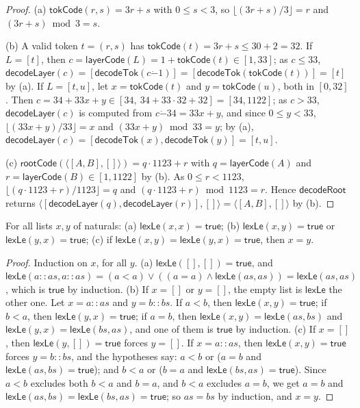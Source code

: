 \begin{proof}
(a) $\mathsf{tokCode}(r,s)=3r+s$ with $0\le s<3$, so $\lfloor(3r+s)/3\rfloor=r$ and $(3r+s)\bmod3=s$.

(b) A valid token $t=(r,s)$ has $\mathsf{tokCode}(t)=3r+s\le30+2=32$. If $L=[t]$, then
$c=\mathsf{layerCode}(L)=1+\mathsf{tokCode}(t)\in[1,33]$; as $c\le33$,
$\mathsf{decodeLayer}(c)=[\mathsf{decodeTok}(c\mathbin{\dot-}1)]=[\mathsf{decodeTok}(\mathsf{tokCode}(t))]=[t]$ by (a).
If $L=[t,u]$, let $x=\mathsf{tokCode}(t)$ and $y=\mathsf{tokCode}(u)$, both in $[0,32]$. Then
$c=34+33x+y\in[34,\ 34+33\cdot32+32]=[34,1122]$; as $c>33$, $\mathsf{decodeLayer}(c)$ is computed from
$c\mathbin{\dot-}34=33x+y$, and since $0\le y<33$, $\lfloor(33x+y)/33\rfloor=x$ and $(33x+y)\bmod33=y$; by (a),
$\mathsf{decodeLayer}(c)=[\mathsf{decodeTok}(x),\mathsf{decodeTok}(y)]=[t,u]$.

(c) $\mathsf{rootCode}(\langle[A,B],[]\rangle)=q\cdot1123+r$ with $q=\mathsf{layerCode}(A)$ and
$r=\mathsf{layerCode}(B)\in[1,1122]$ by (b). As $0\le r<1123$, $\lfloor(q\cdot1123+r)/1123\rfloor=q$ and
$(q\cdot1123+r)\bmod1123=r$. Hence $\mathsf{decodeRoot}$ returns
$\langle[\mathsf{decodeLayer}(q),\mathsf{decodeLayer}(r)],[]\rangle=\langle[A,B],[]\rangle$ by (b).
\end{proof}

\begin{lemma}\label{cb:lem:lex}
For all lists $x,y$ of naturals: (a) $\mathsf{lexLe}(x,x)=\mathsf{true}$; (b) $\mathsf{lexLe}(x,y)=\mathsf{true}$ or
$\mathsf{lexLe}(y,x)=\mathsf{true}$; (c) if $\mathsf{lexLe}(x,y)=\mathsf{lexLe}(y,x)=\mathsf{true}$, then $x=y$.
\end{lemma}

\begin{proof}
Induction on $x$, for all $y$.
(a) $\mathsf{lexLe}([],[])=\mathsf{true}$, and
$\mathsf{lexLe}(a\mathbin{::}as,a\mathbin{::}as)=(a<a)\vee((a=a)\wedge\mathsf{lexLe}(as,as))=\mathsf{lexLe}(as,as)$,
which is $\mathsf{true}$ by induction.
(b) If $x=[]$ or $y=[]$, the empty list is $\mathsf{lexLe}$ the other one. Let $x=a\mathbin{::}as$ and
$y=b\mathbin{::}bs$. If $a<b$, then $\mathsf{lexLe}(x,y)=\mathsf{true}$; if $b<a$, then $\mathsf{lexLe}(y,x)=\mathsf{true}$;
if $a=b$, then $\mathsf{lexLe}(x,y)=\mathsf{lexLe}(as,bs)$ and $\mathsf{lexLe}(y,x)=\mathsf{lexLe}(bs,as)$, and one of
them is $\mathsf{true}$ by induction.
(c) If $x=[]$, then $\mathsf{lexLe}(y,[])=\mathsf{true}$ forces $y=[]$. If $x=a\mathbin{::}as$, then
$\mathsf{lexLe}(x,y)=\mathsf{true}$ forces $y=b\mathbin{::}bs$, and the hypotheses say: $a<b$ or ($a=b$ and
$\mathsf{lexLe}(as,bs)=\mathsf{true}$); and $b<a$ or ($b=a$ and $\mathsf{lexLe}(bs,as)=\mathsf{true}$). Since $a<b$
excludes both $b<a$ and $b=a$, and $b<a$ excludes $a=b$, we get $a=b$ and
$\mathsf{lexLe}(as,bs)=\mathsf{lexLe}(bs,as)=\mathsf{true}$; so $as=bs$ by induction, and $x=y$.
\end{proof}

